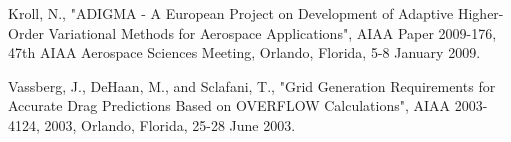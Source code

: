 \begin{thebibliography}{9}


 Kroll, N., "ADIGMA - A European Project on Development of Adaptive Higher-Order Variational Methods for Aerospace Applications", AIAA Paper 2009-176, 47th AIAA Aerospace Sciences Meeting, Orlando, Florida, 5-8 January 2009.


 Vassberg, J., DeHaan, M., and Sclafani, T., "Grid Generation Requirements for Accurate Drag Predictions Based on OVERFLOW Calculations", AIAA 2003-4124, 2003, Orlando, Florida, 25-28 June 2003.


\end{thebibliography}



